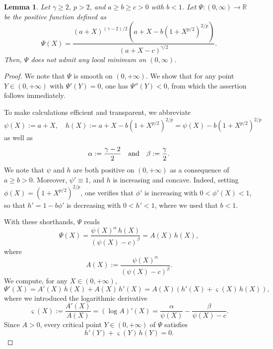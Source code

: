 \documentclass[reqno,11pt]{amsart}
\numberwithin{equation}{section}
\newtheorem{lemma}[theorem]{Lemma}
\theoremstyle{definition}
\theoremstyle{remark}
\newcommand{\R}{\mathbb{R}}
\begin{document}
\begin{lemma}
\label{lemma:F-no-local-min}
Let $\gamma \geqslant 2$, $p> 2$, and $a \geqslant b \geqslant c > 0$ with $b < 1$. Let $\Psi:(0,\infty)\to \R$ be the positive function defined as
\[
\Psi(X) = \frac{(a + X)^{(\gamma-2)/2}\left(a + X - b(1 + X^{p/2})^{2/p}\right)}{(a + X - c)^{\gamma/2}}.
\]
Then, $\Psi$ does not admit any local minimum on $(0, \infty)$.
\end{lemma}

\begin{proof}
We note that $\Psi$ is smooth on $(0, +\infty)$. We show that for any point $Y \in (0, +\infty)$ with $\Psi'(Y) = 0$, one has $\Psi''(Y) < 0$, from which the assertion follows immediately.

To make calculations efficient and transparent, we abbreviate
\[
\psi(X) := a + X, \quad h(X) := a + X - b\left(1 + X^{p/2}\right)^{2/p} = \psi(X) - b\left(1 + X^{p/2}\right)^{2/p}
\]
as well as
\[
\alpha := \frac{\gamma - 2}{2} \quad {\rm and} \quad \beta := \frac{\gamma}{2}.
\]
We note that $\psi$ and $h$ are both positive on $(0, +\infty)$ as a consequence of $a \geqslant b > 0$. Moreover, $\psi' \equiv 1$, and $h$ is increasing and concave. Indeed, setting $\phi(X) = (1 + X^{p/2})^{2/p}$, one verifies that $\phi'$ is increasing with $0 < \phi'(X) < 1$, so that $h' = 1 - b\phi'$ is decreasing with $0 < h' < 1$, where we used that $b < 1$.

With these shorthands, $\Psi$ reads
\[
\Psi(X) = \frac{\psi(X)^\alpha\, h(X)}{(\psi(X) - c)^\beta} = A(X)\, h(X),
\]
where
\[
A(X) := \frac{\psi(X)^\alpha}{(\psi(X) - c)^\beta}.
\]
We compute, for any $X \in (0, +\infty)$,
\[
\Psi'(X) = A'(X)\, h(X) + A(X)\, h'(X) = A(X)\left(h'(X) + \varsigma(X)\, h(X)\right),
\]
where we introduced the logarithmic derivative
\[
\varsigma(X) := \frac{A'(X)}{A(X)} = (\log A)'(X) = \frac{\alpha}{\psi(X)} - \frac{\beta}{\psi(X) - c}.
\]
Since $A > 0$, every critical point $Y \in (0, +\infty)$ of $\Psi$ satisfies
\begin{equation}
\label{eq:h-q-critical}
h'(Y) + \varsigma(Y)\, h(Y) = 0.
\end{equation}


\end{proof}
\end{document}
